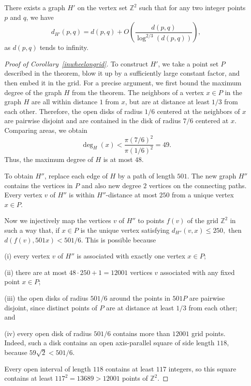 \documentclass[10pt,a4paper]{amsart}
\newcommand{\ZZ}{{\mathbb Z}}
\begin{document}
\begin{corollary}\label{inwheelongrid}
There exists a graph $H'$ on the vertex set ${\ZZ}^2$ such that for any two integer points $p$ and $q$, we have $$d_{H'}(p,q)=d(p,q)+O\left(\frac{d(p,q)}{\log^{2/3}(d(p,q))}\right),$$
as $d(p,q)$ tends to infinity.
\end{corollary}

\begin{proof}[Proof of Corollary~\ref{inwheelongrid}]
To construct $H'$, we take a point set $P$ described in the theorem, blow it up by a sufficiently large constant factor, and then embed it in the grid. For a precise argument, we first bound the maximum degree of the graph $H$ from the theorem. The neighbors of a vertex $x\in P$ in the graph $H$ are all within distance $1$ from $x$, but are at distance at least $1/3$ from each other. Therefore, the open disks of radius $1/6$ centered at the neighbors of $x$ are pairwise disjoint and are contained in the disk of radius $7/6$ centered at $x$. Comparing areas, we obtain
$$
\deg_H(x)<\frac{\pi(7/6)^2}{\pi(1/6)^2}=49.
$$
Thus, the maximum degree of $H$ is at most $48$.

To obtain $H''$, replace each edge of $H$ by a path of length $501$. The new graph $H''$ contains the vertices in $P$ and also new degree $2$ vertices on the connecting paths. Every vertex $v$ of $H''$ is within $H''$-distance at most $250$ from a unique vertex $x\in P$.

Now we injectively map the vertices $v$ of $H''$ to points $f(v)$ of the grid $\ZZ^2$ in such a way that, if $x\in P$ is the unique vertex satisfying
$d_{H''}(v,x)\leq 250,$ then $d(f(v),501x)<501/6.$ This is possible because

(i) every vertex $v$ of $H''$ is associated with exactly one vertex $x\in P$;

(ii) there are at most $48\cdot250+1=12001$
vertices $v$ associated with any fixed point $x\in P$;

(iii) the open disks of radius $501/6$ around the points in $501P$ are pairwise disjoint, since distinct points of $P$ are at distance at least $1/3$ from each other; and

(iv) every open disk of radius $501/6$ contains more than $12001$ grid points. Indeed, such a disk contains an open axis-parallel square of side length $118$, because $59\sqrt{2}<501/6.$

Every open interval of length $118$ contains at least $117$ integers, so this square contains at least
$117^2=13689>12001$ points of $\ZZ^2$.


\end{proof}
\end{document}
